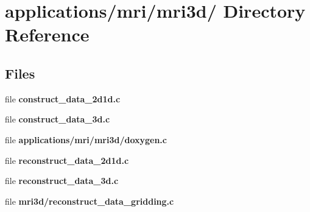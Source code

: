 \hypertarget{dir_000009}{
\section{applications/mri/mri3d/ Directory Reference}
\label{dir_000009}
}
\subsection*{Files}
\begin{CompactItemize}
\item 
file {\bf construct\_\-data\_\-2d1d.c}
\item 
file {\bf construct\_\-data\_\-3d.c}
\item 
file {\bf applications/mri/mri3d/doxygen.c}
\item 
file {\bf reconstruct\_\-data\_\-2d1d.c}
\item 
file {\bf reconstruct\_\-data\_\-3d.c}
\item 
file {\bf mri3d/reconstruct\_\-data\_\-gridding.c}
\end{CompactItemize}
